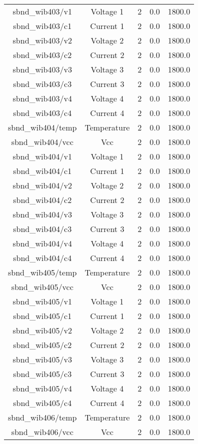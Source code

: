 \begin{table}[ptb]
\begin{tabular}{c | c c c c}
sbnd_wib403/v1 & Voltage 1 & 2 & 0.0 & 1800.0\\ 
sbnd_wib403/c1 & Current 1 & 2 & 0.0 & 1800.0\\ 
sbnd_wib403/v2 & Voltage 2 & 2 & 0.0 & 1800.0\\ 
sbnd_wib403/c2 & Current 2 & 2 & 0.0 & 1800.0\\ 
sbnd_wib403/v3 & Voltage 3 & 2 & 0.0 & 1800.0\\ 
sbnd_wib403/c3 & Current 3 & 2 & 0.0 & 1800.0\\ 
sbnd_wib403/v4 & Voltage 4 & 2 & 0.0 & 1800.0\\ 
sbnd_wib403/c4 & Current 4 & 2 & 0.0 & 1800.0\\ 
sbnd_wib404/temp & Temperature & 2 & 0.0 & 1800.0\\ 
sbnd_wib404/vcc & Vcc & 2 & 0.0 & 1800.0\\ 
sbnd_wib404/v1 & Voltage 1 & 2 & 0.0 & 1800.0\\ 
sbnd_wib404/c1 & Current 1 & 2 & 0.0 & 1800.0\\ 
sbnd_wib404/v2 & Voltage 2 & 2 & 0.0 & 1800.0\\ 
sbnd_wib404/c2 & Current 2 & 2 & 0.0 & 1800.0\\ 
sbnd_wib404/v3 & Voltage 3 & 2 & 0.0 & 1800.0\\ 
sbnd_wib404/c3 & Current 3 & 2 & 0.0 & 1800.0\\ 
sbnd_wib404/v4 & Voltage 4 & 2 & 0.0 & 1800.0\\ 
sbnd_wib404/c4 & Current 4 & 2 & 0.0 & 1800.0\\ 
sbnd_wib405/temp & Temperature & 2 & 0.0 & 1800.0\\ 
sbnd_wib405/vcc & Vcc & 2 & 0.0 & 1800.0\\ 
sbnd_wib405/v1 & Voltage 1 & 2 & 0.0 & 1800.0\\ 
sbnd_wib405/c1 & Current 1 & 2 & 0.0 & 1800.0\\ 
sbnd_wib405/v2 & Voltage 2 & 2 & 0.0 & 1800.0\\ 
sbnd_wib405/c2 & Current 2 & 2 & 0.0 & 1800.0\\ 
sbnd_wib405/v3 & Voltage 3 & 2 & 0.0 & 1800.0\\ 
sbnd_wib405/c3 & Current 3 & 2 & 0.0 & 1800.0\\ 
sbnd_wib405/v4 & Voltage 4 & 2 & 0.0 & 1800.0\\ 
sbnd_wib405/c4 & Current 4 & 2 & 0.0 & 1800.0\\ 
sbnd_wib406/temp & Temperature & 2 & 0.0 & 1800.0\\ 
sbnd_wib406/vcc & Vcc & 2 & 0.0 & 1800.0\\ 

\end{tabular}
\end{table}
